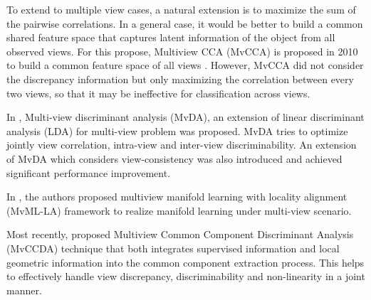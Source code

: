        To extend to multiple view cases, a natural extension is to maximize the sum of the pairwise correlations.
        In a general case, it would be better to build a common shared feature space that captures latent information of the object from all observed views.
        For this propose, Multiview CCA (MvCCA) is proposed in 2010 to build a common feature space of all views \cite{rupnik2010multi}. 
        However, MvCCA did not consider the discrepancy information but only maximizing the correlation between every two views, so that it may be ineffective for classification across views. 

        In \cite{kan2015multi}, Multi-view discriminant analysis (MvDA), an extension of linear discriminant analysis (LDA) for multi-view problem was proposed.
        MvDA tries to optimize jointly view correlation, intra-view and inter-view discriminability. 
        An extension of MvDA which considers view-consistency was also introduced and achieved significant performance improvement.

        In \cite{zhao2018multi}, the authors proposed multiview manifold learning with locality alignment (MvML-LA) framework to realize manifold learning under multi-view scenario. 

        Most recently, \cite{you2019multi} proposed Multiview Common Component Discriminant Analysis (MvCCDA) technique that both integrates supervised information and local geometric information into the common component extraction process.
        This helps to effectively handle view discrepancy, discriminability and non-linearity in a joint manner.

